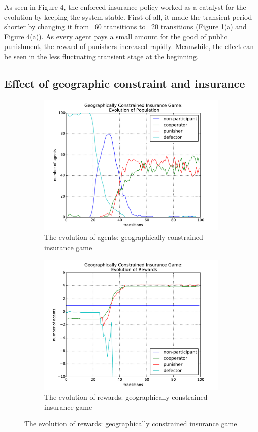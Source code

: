 \documentclass[11pt]{article}
\begin{document}
As seen in Figure 4, the enforced insurance policy worked as a catalyst for the evolution by keeping the system stable. First of all, it made the transient period shorter by changing it from ~60 transitions to ~20 transitions (Figure 1(a) and Figure 4(a)). As every agent pays a small amount for the good of public punishment, the reward of punishers increased rapidly. Meanwhile, the effect can be seen in the less fluctuating transient stage at the beginning.
\subsection{Effect of geographic constraint and insurance}
\begin{figure}[!h]
 \caption{Geographically constrained insurance game}
 \begin{subfigure}{.5\textwidth}
   \centering
   \caption{The evolution of agents: geographically constrained insurance game}
   \includegraphics[scale = 0.4]{14.pdf}
 \end{subfigure}
 \begin{subfigure}{.5\textwidth}
   \centering
   \label{}
   \caption{The evolution of rewards: geographically constrained insurance game}
   \includegraphics[scale = 0.4]{15.pdf}
 \end{subfigure}
\end{figure}
\end{document}
